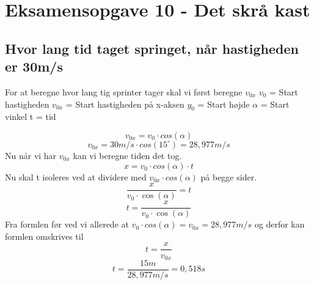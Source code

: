 \newpage
\section{Eksamensopgave 10 - Det skrå kast}
\subsection{Hvor lang tid taget springet, når hastigheden er 30m/s}
For at beregne hvor lang tig sprinter tager skal vi først beregne \begin{math}v_{0x}\end{math}\newline
\begin{math}v_{0}\end{math} = Start hastigheden\newline
\begin{math}v_{0x}\end{math} = Start hastigheden på x-aksen\newline
\begin{math}y_{0}\end{math} = Start højde\newline
\begin{math}\alpha\end{math} = Start vinkel\newline
t = tid

\begin{equation*}
    v_{0x}=v_{0}\cdot cos(\alpha)
\end{equation*}
\begin{equation*}
    v_{0x}=30m/s\cdot cos(15^{\circ}) = 28,977 m/s
\end{equation*}
Nu når vi har \begin{math}v_{0x}\end{math} kan vi beregne tiden det tog.
\begin{equation*}
    x=v_{0}\cdot cos(\alpha)\cdot t
\end{equation*}
Nu skal t isoleres ved at dividere med \begin{math}v_{0x}\cdot cos(\alpha)\end{math} på begge sider.
\begin{equation*}
    \frac{x}{v_{0}\cdot \cos(\alpha)}=t
\end{equation*}
\begin{equation*}
    t=\frac{x}{v_{0}\cdot \cos(\alpha)}
\end{equation*}
Fra formlen før ved vi allerede at \begin{math}v_{0}\cdot cos(\alpha) = v_{0x} = 28,977m/s\end{math} og derfor kan formlen omskrives til
\begin{equation*}
    t=\frac{x}{v_{0x}}
\end{equation*}
\begin{equation*}
    t=\frac{15m}{28,977m/s} = 0,518 s
\end{equation*}



